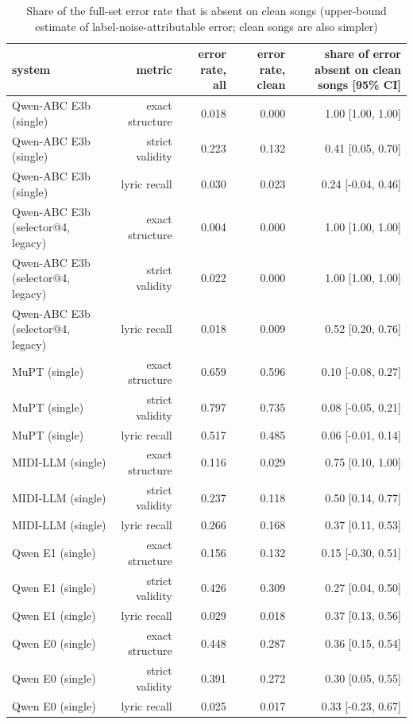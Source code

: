 \begin{table}[t]
\centering
\small
\begin{tabular}{lrrrr}
\toprule
system & metric & error rate, all & error rate, clean & share of error absent on clean songs [95\% CI] \\
\midrule
Qwen-ABC E3b (single) & exact structure & 0.018 & 0.000 & 1.00 [1.00, 1.00] \\
Qwen-ABC E3b (single) & strict validity & 0.223 & 0.132 & 0.41 [0.05, 0.70] \\
Qwen-ABC E3b (single) & lyric recall & 0.030 & 0.023 & 0.24 [-0.04, 0.46] \\
Qwen-ABC E3b (selector@4, legacy) & exact structure & 0.004 & 0.000 & 1.00 [1.00, 1.00] \\
Qwen-ABC E3b (selector@4, legacy) & strict validity & 0.022 & 0.000 & 1.00 [1.00, 1.00] \\
Qwen-ABC E3b (selector@4, legacy) & lyric recall & 0.018 & 0.009 & 0.52 [0.20, 0.76] \\
MuPT (single) & exact structure & 0.659 & 0.596 & 0.10 [-0.08, 0.27] \\
MuPT (single) & strict validity & 0.797 & 0.735 & 0.08 [-0.05, 0.21] \\
MuPT (single) & lyric recall & 0.517 & 0.485 & 0.06 [-0.01, 0.14] \\
MIDI-LLM (single) & exact structure & 0.116 & 0.029 & 0.75 [0.10, 1.00] \\
MIDI-LLM (single) & strict validity & 0.237 & 0.118 & 0.50 [0.14, 0.77] \\
MIDI-LLM (single) & lyric recall & 0.266 & 0.168 & 0.37 [0.11, 0.53] \\
Qwen E1 (single) & exact structure & 0.156 & 0.132 & 0.15 [-0.30, 0.51] \\
Qwen E1 (single) & strict validity & 0.426 & 0.309 & 0.27 [0.04, 0.50] \\
Qwen E1 (single) & lyric recall & 0.029 & 0.018 & 0.37 [0.13, 0.56] \\
Qwen E0 (single) & exact structure & 0.448 & 0.287 & 0.36 [0.15, 0.54] \\
Qwen E0 (single) & strict validity & 0.391 & 0.272 & 0.30 [0.05, 0.55] \\
Qwen E0 (single) & lyric recall & 0.025 & 0.017 & 0.33 [-0.23, 0.67] \\
\bottomrule
\end{tabular}
\caption{Share of the full-set error rate that is absent on clean songs (upper-bound estimate of label-noise-attributable error; clean songs are also simpler)}
\label{tab:annotation_noise_attribution}
\end{table}
